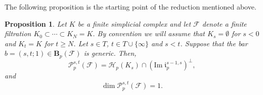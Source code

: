 \documentclass[11pt]{amsart}
\theoremstyle{theorem}
\newtheorem{proposition}{Proposition}[section]
\theoremstyle{remark}
\theoremstyle{definition}
\begin{document}
The following proposition is the starting point of the reduction mentioned above.
\begin{proposition}
    \label{prop:simplified}
    Let $K$ be a finite simplicial complex and  
let $\mathcal{F}$ denote a finite filtration
$K_0 \subset \cdots \subset K_N= K$.
By convention we will assume that $K_s = \emptyset$ for $s <0$ and 
$K_t = K$ for $t \geq N$.
    Let $s \in T$, $t \in T \cup \{\infty\}$ and $s < t$.
Suppose that the bar $b = (s,t;1) \in \mathbf{B}_p(\mathcal{F})$ is generic.
Then, 
    \[
    \mathcal{P}_p^{s,t}(\mathcal{F}) = \mathcal{H}_p(K_s) \cap (\mathrm{Im} \; \mathfrak{i}_p^{s-1,s})^\perp,
    \]
and 
\[
\dim \mathcal{P}_p^{s,t}(\mathcal{F}) = 1.
\]
\end{proposition}
\end{document}
